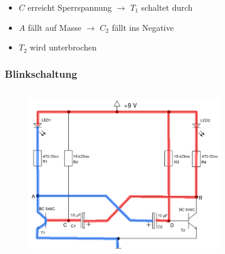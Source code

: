 \begin{frame}
\begin{columns}[c]
\begin{figure}[H]
\begin{center}
    \end{center}
    \end{figure}
    \end{columns}
    \begin{block}{}
         \begin{itemize}
            \item $C$ erreicht Sperrspannung $\rightarrow$ $T_1$ schaltet durch
            \item $A$ fällt auf Masse $\rightarrow$ $C_2$ fällt ins Negative
            \item $T_2$ wird unterbrochen
         \end{itemize}
    \end{block}
\end{frame}
\begin{frame}
    \frametitle{Blinkschaltung}
    \begin{columns}[c]
        \begin{figure}[H]
        \begin{center}
                \includegraphics[scale=0.3]{./img/schaltungen/blink_2.png}
        \end{center}
        \end{figure}
    \begin{figure}[H]
    \begin{center}

\end{center}
\end{figure}
\end{columns}
\end{frame}
